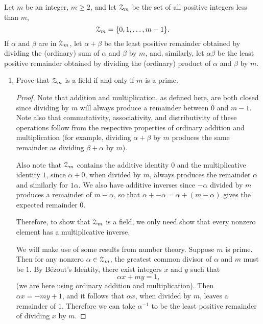  Let $m$ be an integer, $m\geq2$, and let $\mathcal{Z}_m$ be the set
of all positive integers less than $m$,
\begin{equation*}
  \mathcal{Z}_m = \{0,1,\dots,m-1\}.
\end{equation*}
If $\alpha$ and $\beta$ are in $\mathcal{Z}_m$, let $\alpha + \beta$ be the
least positive remainder obtained by dividing the (ordinary) sum of
$\alpha$ and $\beta$ by $m$, and, similarly, let $\alpha\beta$ be the
least positive remainder obtained by dividing the (ordinary) product
of $\alpha$ and $\beta$ by $m$.
\begin{enumerate}
\item Prove that $\mathcal{Z}_m$ is a field if and only if $m$ is a prime.
  \begin{proof}
    Note that addition and multiplication, as defined here, are both
    closed since dividing by $m$ will always produce a remainder
    between $0$ and $m - 1$. Note also that commutativity,
    associativity, and distributivity of these operations follow from
    the respective properties of ordinary addition and multiplication
    (for example, dividing $\alpha + \beta$ by $m$ produces the same
    remainder as dividing $\beta + \alpha$ by $m$).

    Also note that $\mathcal{Z}_m$ contains the additive identity $0$ and the
    multiplicative identity $1$, since $\alpha + 0$, when divided by
    $m$, always produces the remainder $\alpha$ and similarly for
    $1\alpha$. We also have additive inverses since $-\alpha$ divided
    by $m$ produces a remainder of $m - \alpha$, so that
    $\alpha + -\alpha = \alpha + (m - \alpha)$ gives the expected
    remainder $0$.

    Therefore, to show that $\mathcal{Z}_m$ is a field, we only need show that
    every nonzero element has a multiplicative inverse.

    We will make use of some results from number theory. Suppose $m$
    is prime. Then for any nonzero $\alpha\in\mathcal{Z}_m$, the greatest
    common divisor of $\alpha$ and $m$ must be $1$. By B\'ezout's
    Identity, there exist integers $x$ and $y$ such that
    \begin{equation*}
      \alpha x + my = 1,
    \end{equation*}
    (we are here using ordinary addition and multiplication). Then
    $\alpha x = -my + 1$, and it follows that $\alpha x$, when divided
    by $m$, leaves a remainder of $1$. Therefore we can take
    $\alpha^{-1}$ to be the least positive remainder of dividing $x$
    by $m$.


\end{proof}
\end{enumerate}
